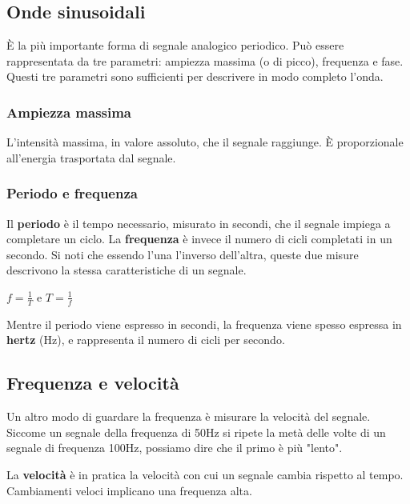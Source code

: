     \subsection{Onde sinusoidali}
        È la più importante forma di segnale analogico periodico. Può essere rappresentata da tre parametri: ampiezza massima (o di picco), frequenza e fase. Questi tre parametri sono sufficienti per descrivere in modo completo l'onda.
        
        \subsubsection{Ampiezza massima}
            L'intensità massima, in valore assoluto, che il segnale raggiunge. È proporzionale all'energia trasportata dal segnale.
            
        \subsubsection{Periodo e frequenza}
            Il \textbf{periodo} è il tempo necessario, misurato in secondi, che il segnale impiega a completare un ciclo. La \textbf{frequenza} è invece il numero di cicli completati in un secondo. Si noti che essendo l'una l'inverso dell'altra, queste due misure descrivono la stessa caratteristiche di un segnale.
            \begin{center}
                $f = \frac{1}{T}$ \hspace{5mm} e \hspace{5mm} $T = \frac{1}{f}$
            \end{center}
            
            Mentre il periodo viene espresso in secondi, la frequenza viene spesso espressa in \textbf{hertz} (Hz), e rappresenta il numero di cicli per secondo.
            
    \subsection{Frequenza e velocità}
        Un altro modo di guardare la frequenza è misurare la velocità del segnale. Siccome un segnale della frequenza di 50Hz si ripete la metà delle volte di un segnale di frequenza 100Hz, possiamo dire che il primo è più "lento".
            
        La \textbf{velocità} è in pratica la velocità con cui un segnale cambia rispetto al tempo. Cambiamenti veloci implicano una frequenza alta.
            
